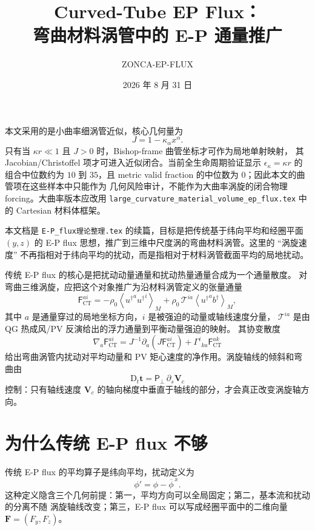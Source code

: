 \documentclass[12pt,a4paper]{ctexart}
\title{\bfseries Curved-Tube EP Flux：\\弯曲材料涡管中的 E-P 通量推广}
\author{ZONCA-EP-FLUX}
\date{2026 年 8 月 31 日}
\newcommand{\p}{\partial}
\newcommand{\D}{\mathrm D}
\newcommand{\mean}[1]{\left\langle #1\right\rangle_M}
\newcommand{\fluc}[1]{#1^{\dagger}}
\newcommand{\bt}{\boldsymbol t}
\newcommand{\bV}{\boldsymbol V}
\newcommand{\PP}{\boldsymbol{\mathsf P}_{\perp}}
\newcommand{\FF}{\mathsf F_{\mathrm{CT}}}
\newcommand{\TT}{\mathcal T}
\begin{document}
\maketitle

\begin{tcolorbox}[colback=red!3,colframe=red!65!black,title={适用条件警告},fonttitle=\bfseries]
本文采用的是小曲率细涡管近似，核心几何量为
\[
  J=1-\kappa_\alpha x^\alpha .
\]
只有当 $\kappa r\ll1$ 且 $J>0$ 时，Bishop-frame 曲管坐标才可作为局地单射映射，
其 Jacobian/Christoffel 项才可进入近似闭合。当前全生命周期验证显示
$\epsilon_\kappa=\kappa r$ 的组合中位数约为 $10$ 到 $35$，且
metric valid fraction 的中位数为 $0$；因此本文的曲管项在这些样本中只能作为
几何风险审计，不能作为大曲率涡旋的闭合物理 forcing。大曲率版本应改用
\texttt{large\_curvature\_material\_volume\_ep\_flux.tex} 中的 Cartesian 材料体框架。
\end{tcolorbox}

本文档是 \texttt{E-P\_flux理论整理.tex} 的续篇，目标是把传统基于纬向平均和经圈平面
$(y,z)$ 的 E-P flux 思想，推广到三维中尺度涡的弯曲材料涡管。这里的 ``涡旋速度''
不再指相对于纬向平均的扰动，而是指相对于材料涡管截面平均的局地扰动。

\begin{tcolorbox}[colback=blue!3,colframe=blue!60!black,title={核心结论},fonttitle=\bfseries]
传统 E-P flux 的核心是把扰动动量通量和扰动热量通量合成为一个通量散度。
对弯曲三维涡旋，应把这个对象推广为沿材料涡管定义的张量通量
\[
  \FF^{ai}
  =
  -\rho_0 \mean{{u^\dagger}^{a}{u^\dagger}^{i}}
  +\rho_0\,\TT^{ia}\mean{{u^\dagger}^{a}\fluc{b}},
\]
其中 $a$ 是通量穿过的局地坐标方向，$i$ 是被强迫的动量或轴线速度分量，
$\TT^{ia}$ 是由 QG 热成风/PV 反演给出的浮力通量到平衡动量强迫的映射。
其协变散度
\[
  \nabla_a\FF^{ai}
  =
  J^{-1}\p_a(J\FF^{ai})
  +\Gamma^i{}_{ka}\FF^{ak}
\]
给出弯曲涡管内扰动对平均动量和 PV 矩心速度的净作用。涡旋轴线的倾斜和弯曲由
\[
  \D_t\bt=\PP\,\p_s\bV_c
\]
控制：只有轴线速度 $\bV_c$ 的轴向梯度中垂直于轴线的部分，才会真正改变涡旋轴方向。
\end{tcolorbox}

\section{为什么传统 E-P flux 不够}

传统 E-P flux 的平均算子是纬向平均，扰动定义为
\[
  \phi'=\phi-\overline{\phi}^{\,x}.
\]
这种定义隐含三个几何前提：第一，平均方向可以全局固定；第二，基本流和扰动的分离不随
涡旋轴线改变；第三，E-P flux 可以写成经圈平面中的二维向量
$\boldsymbol F=(F_y,F_z)$。
\end{document}
